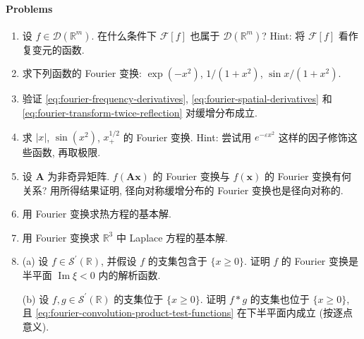 \paragraph*{Problems}

\begin{enumerate}[label=\thesection.\arabic*.,ref=\thesection.\arabic*,start=45,series=book-problems]

\item\label{ex:compact-fourier-compact-support} 设 $f\in\mathcal{D}(\mathbb{R}^m)$. 在什么条件下 $\mathcal{F}[f]$ 也属于 $\mathcal{D}(\mathbb{R}^m)$? Hint: 将 $\mathcal{F}[f]$ 看作复变元的函数.

\item\label{ex:fourier-gaussian-rational-transforms} 求下列函数的 Fourier 变换: $\exp(-x^2)$, $1/(1+x^2)$, $\sin x/(1+x^2)$.

\item\label{ex:tempered-fourier-differentiation-reflection} 验证 \eqref{eq:fourier-frequency-derivatives}, \eqref{eq:fourier-spatial-derivatives} 和 \eqref{eq:fourier-transform-twice-reflection} 对缓增分布成立.

\item\label{ex:fourier-polynomial-growth-regularizations} 求 $|x|$, $\sin(x^2)$, $x_+^{1/2}$ 的 Fourier 变换. Hint: 尝试用 $e^{-\varepsilon x^2}$ 这样的因子修饰这些函数, 再取极限.

\item\label{ex:fourier-linear-change-radial-symmetry} 设 $\bm{A}$ 为非奇异矩阵. $f(\bm{A}\bm{x})$ 的 Fourier 变换与 $f(\bm{x})$ 的 Fourier 变换有何关系? 用所得结果证明, 径向对称缓增分布的 Fourier 变换也是径向对称的.

\item\label{ex:fourier-heat-fundamental-solution} 用 Fourier 变换求热方程的基本解.

\item\label{ex:fourier-laplace-fundamental-three-dimensions} 用 Fourier 变换求 $\mathbb{R}^3$ 中 Laplace 方程的基本解.

\item\label{ex:one-sided-tempered-fourier-product} (a) 设 $f\in\mathcal{S}^{\prime}(\mathbb{R})$, 并假设 $f$ 的支集包含于 $\{x\geq0\}$. 证明 $f$ 的 Fourier 变换是半平面 $\operatorname{Im}\xi<0$ 内的解析函数.

(b) 设 $f,g\in\mathcal{S}^{\prime}(\mathbb{R})$ 的支集位于 $\{x\geq0\}$. 证明 $f*g$ 的支集也位于 $\{x\geq0\}$, 且 \eqref{eq:fourier-convolution-product-test-functions} 在下半平面内成立 (按逐点意义).


\end{enumerate}
